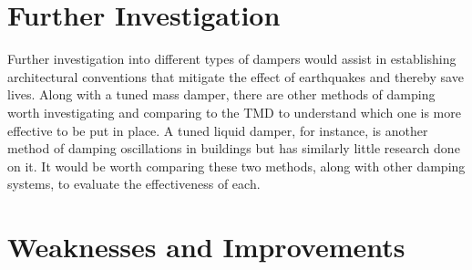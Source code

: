 \documentclass[11pt]{article}
\begin{document}

\section{Further Investigation}
Further investigation into different types of dampers would assist in establishing architectural conventions that mitigate the effect of earthquakes and thereby save lives. Along with a tuned mass damper, there are other methods of damping worth investigating and comparing to the TMD to understand which one is more effective to be put in place. A tuned liquid damper, for instance, is another method of damping oscillations in buildings but has similarly little research done on it. It would be worth comparing these two methods, along with other damping systems, to evaluate the effectiveness of each.

\section{Weaknesses and Improvements}
\end{document}
